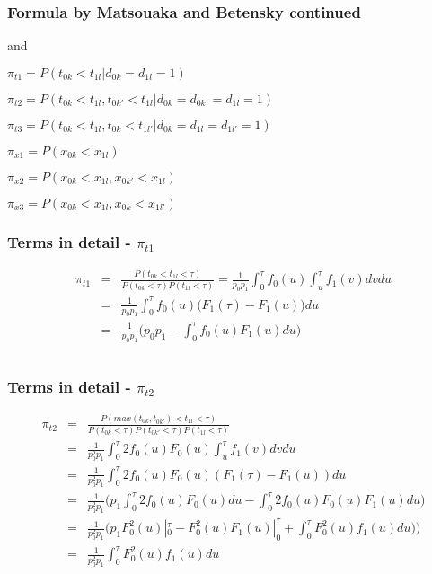 \documentclass[xcolor=pdftex,dvipsnames,table]{beamer}
\begin{document}
%
\begin{frame} %
\frametitle{Formula by Matsouaka and Betensky continued}
and

$\pi_{t1} = P(t_{0k} < t_{1l} | d_{0k} = d_{1l} = 1)$

$\pi_{t2} = P(t_{0k} < t_{1l}, t_{0k'} < t_{1l} | d_{0k} = d_{0k'} = d_{1l} = 1)$

$\pi_{t3} = P(t_{0k} < t_{1l}, t_{0k} < t_{1l'} | d_{0k} = d_{1l} = d_{1l'} =1)$

$\pi_{x1} = P(x_{0k} < x_{1l})$

$\pi_{x2} = P(x_{0k} < x_{1l}, x_{0k'} < x_{1l})$

$\pi_{x3} = P(x_{0k} < x_{1l}, x_{0k} < x_{1l'})$
\end{frame}


\begin{frame} %
\frametitle{Terms in detail - $\pi_{t1}$}
\begin{eqnarray*}
  \pi_{t1} & = & \frac{P(t_{0k} < t_{1l} < \tau)}{P(t_{0k} < \tau)P(t_{1l} < \tau)}
= \frac{1}{p_0 p_1}\int_0^\tau f_0(u)\int_u^\tau f_1(v)dv du  \\
& = &  \frac{1}{p_0 p_1}\int_0^\tau f_0(u)\Big( F_1(\tau) - F_1(u)\Big)du \\
& = & \frac{1}{p_0 p_1}\Big( p_0 p_1 - \int_0^\tau f_0(u)F_1(u) du \Big) \\
\\
\end{eqnarray*}
\end{frame}

\begin{frame} %
\frametitle{Terms in detail - $\pi_{t2}$}
\begin{eqnarray*}
\pi_{t2} & = &\frac{P(max(t_{0k}, t_{0k'}) < t_{1l} < \tau)}{P(t_{0k} < \tau)P(t_{0k'} < \tau)P(t_{1l} < \tau)} \\
& = & \frac{1}{p_0^2 p_1} \int_0^\tau 2f_0(u) F_0(u)\int_u^\tau f_1(v)dv du \\
& = & \frac{1}{p_0^2 p_1} \int_0^\tau 2f_0(u) F_0(u) (F_1(\tau) - F_1(u)) du  \\
& = &  \frac{1}{p_0^2 p_1} \Big(p_1 \int_0^\tau 2 f_0(u) F_0(u) du - \int_0^\tau 2 f_0(u) F_0(u) F_1(u) du \Big) \\
& = & \frac{1}{p_0^2 p_1} \Big(p_1 F_0^2(u)|_0^\tau - F_0^2(u) F_1(u)|_0^\tau + \int_0^\tau F_0^2(u) f_1(u)du) \Big) \\
& = & \frac{1}{p_0^2 p_1} \int_0^\tau F_0^2(u) f_1(u)du \\
\\
\end{eqnarray*}
\end{frame}
\end{document}
